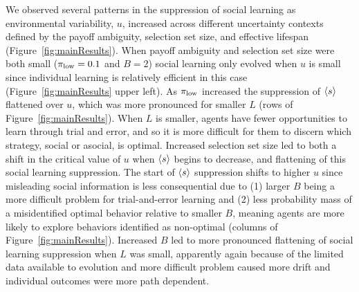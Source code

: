 \documentclass[letterpaper,11.5pt]{scrartcl}
\begin{document}
We observed several patterns in the suppression of social learning as environmental
variability, $u$, increased across different uncertainty contexts defined by the
payoff ambiguity, selection set size, and effective lifespan
(Figure~\ref{fig:mainResults}). When payoff ambiguity and selection set size
were both small ($\pi_{\mathrm{low}} = 0.1$ and $B=2$) social learning only evolved when
$u$ is small since individual learning is relatively efficient in this case
(Figure~\ref{fig:mainResults} upper left). As $\pi_{\mathrm{low}}$ increased the suppression of
$\langle s \rangle$ flattened over $u$, which was more pronounced for smaller $L$ (rows of
Figure~\ref{fig:mainResults}). 
When $L$ is smaller, agents have fewer opportunities to learn through trial and
error, and so it is more difficult for them to discern which strategy, social
or asocial, is optimal. Increased selection set size led to both a shift in 
the critical value of $u$ when $\langle s \rangle$ begins to decrease, and flattening of
this social learning suppression. The start of $\langle s \rangle$ suppression shifts
to higher $u$ since misleading social information is less consequential due to
(1) larger $B$ being a more difficult problem for trial-and-error learning and
(2) less probability mass of a misidentified optimal behavior relative to
smaller $B$, meaning agents are more likely to explore behaviors identified
as non-optimal (columns of Figure~\ref{fig:mainResults}). 
Increased $B$ led to more pronounced flattening of social learning
suppression when $L$ was small, apparently again because of the limited data
available to evolution and more difficult problem caused more drift and individual
outcomes were more path dependent.
\end{document}
